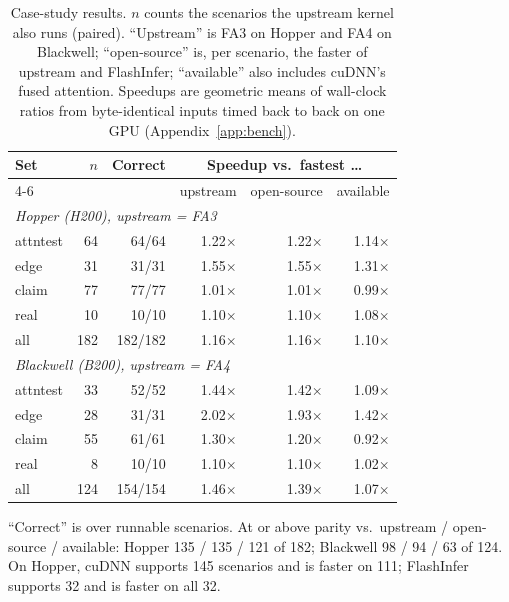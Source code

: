 \begin{table}[t]
\centering\small
\caption{Case-study results. $n$ counts the scenarios the upstream kernel also runs (paired).
``Upstream'' is FA3 on Hopper and FA4 on Blackwell; ``open-source'' is, per scenario, the faster of
upstream and FlashInfer; ``available'' also includes cuDNN's fused attention. Speedups are geometric
means of wall-clock ratios from byte-identical inputs timed back to back on one GPU
(Appendix~\ref{app:bench}).}
\label{tab:casestudy}
\setlength{\tabcolsep}{3pt}\footnotesize
\begin{tabular}{lrrrrr}
\toprule
Set & $n$ & Correct & \multicolumn{3}{c}{Speedup vs.\ fastest \ldots} \\
\cmidrule(lr){4-6}
 & & & upstream & open-source & available \\
\midrule
\multicolumn{6}{l}{\emph{Hopper (H200), upstream = FA3}} \\
attntest   & 64  & 64/64   & 1.22$\times$ & 1.22$\times$ & 1.14$\times$ \\
edge       & 31  & 31/31   & 1.55$\times$ & 1.55$\times$ & 1.31$\times$ \\
claim      & 77  & 77/77   & 1.01$\times$ & 1.01$\times$ & 0.99$\times$ \\
real       & 10  & 10/10   & 1.10$\times$ & 1.10$\times$ & 1.08$\times$ \\
all        & 182 & 182/182 & 1.16$\times$ & 1.16$\times$ & 1.10$\times$ \\
\midrule
\multicolumn{6}{l}{\emph{Blackwell (B200), upstream = FA4}} \\
attntest   & 33  & 52/52   & 1.44$\times$ & 1.42$\times$ & 1.09$\times$ \\
edge       & 28  & 31/31   & 2.02$\times$ & 1.93$\times$ & 1.42$\times$ \\
claim      & 55  & 61/61   & 1.30$\times$ & 1.20$\times$ & 0.92$\times$ \\
real       & 8   & 10/10   & 1.10$\times$ & 1.10$\times$ & 1.02$\times$ \\
all        & 124 & 154/154 & 1.46$\times$ & 1.39$\times$ & 1.07$\times$ \\
\bottomrule
\end{tabular}
\vspace{2pt}

\raggedright\footnotesize ``Correct'' is over runnable scenarios. At or above parity vs.\ upstream /
open-source / available: Hopper 135 / 135 / 121 of 182; Blackwell 98 / 94 / 63 of 124. On Hopper,
cuDNN supports 145 scenarios and \fathree is faster on 111; FlashInfer supports 32 and \fathree is
faster on all 32.
\end{table}

